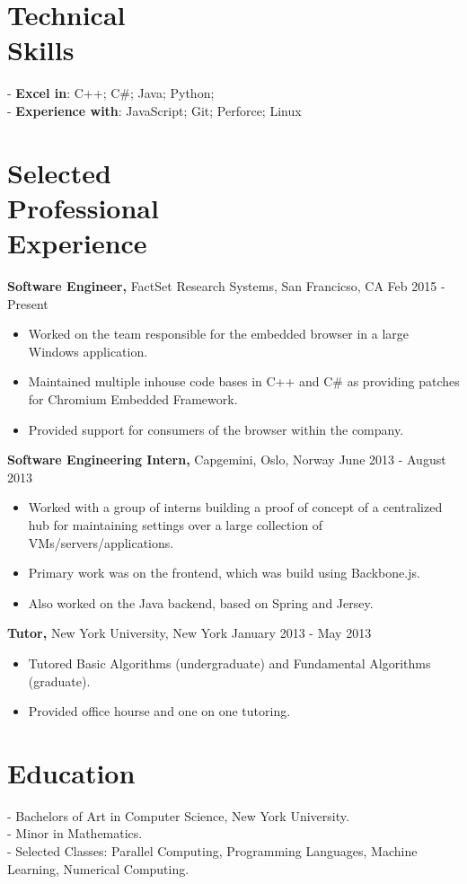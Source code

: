 \documentclass[margin]{res}
\begin{document}
 
\begin{resume}
 
 \section{Technical \\ Skills}
- {\bf Excel in}: C++; C\#; Java; Python; \\
- {\bf Experience with}: JavaScript; Git; Perforce; Linux 
 
\section{Selected \\ Professional \\ Experience}

{\bf Software Engineer,} FactSet Research Systems, San Francicso, CA \hfill Feb 2015 - Present
 \begin{itemize} \itemsep -2pt
 \item Worked on the team responsible for the embedded browser in a large Windows application.
 \item Maintained multiple inhouse code bases in C++ and C\# as providing patches for Chromium Embedded Framework.
 \item Provided support for consumers of the browser within the company.
 \end{itemize}

 {\bf Software Engineering Intern,} Capgemini, Oslo, Norway \hfill June 2013 - August 2013
 \begin{itemize} \itemsep -2pt
 \item Worked with a group of interns building a proof of concept of a centralized hub for maintaining settings over a large collection of VMs/servers/applications.
 \item Primary work was on the frontend, which was build using Backbone.js.
 \item Also worked on the Java backend, based on Spring and Jersey.
 \end{itemize}

 {\bf Tutor,} New York University, New York \hfill January 2013 - May 2013
 \begin{itemize} \itemsep -2pt
 \item Tutored Basic Algorithms (undergraduate) and Fundamental Algorithms (graduate).
 \item Provided office hourse and one on one tutoring.
 \end{itemize}

\section{Education} 
- Bachelors of Art in Computer Science, New York University. \\
- Minor in Mathematics. \\
- Selected Classes: Parallel Computing, Programming Languages, Machine Learning, Numerical Computing.

\end{resume} 
\end{document}
